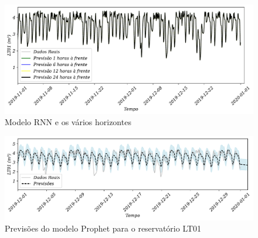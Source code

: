 \begin{figure}[!htb]
	\centering
	\caption{Modelo RNN e os vários horizontes }
	\label{fig:rnn}
	\includegraphics[width=0.6\linewidth]{Resultados/Figuras/RNN}
\end{figure}
\begin{figure}[!htb]
	\centering
	\caption{Previsões do modelo Prophet para o reservatório LT01}\label{fig:prophet1}
	\includegraphics[width=0.7\linewidth]{Apendices/Figuras/modelagem-24h/prophet1}
	
	
\end{figure}



